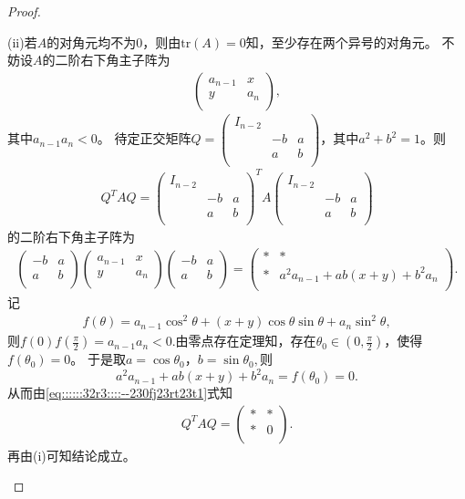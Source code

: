 \documentclass[../../main.tex]{subfiles}%
\begin{document}
\begin{proof}
\begin{enumerate}[(1)]
(ii)若$A$的对角元均不为$0$，则由$\text{tr}(A)=0$知，至少存在两个异号的对角元。
不妨设$A$的二阶右下角主子阵为
\begin{align*}
\begin{pmatrix}
a_{n-1}& x\\
y& a_n\\
\end{pmatrix},
\end{align*}
其中$a_{n-1}a_n<0$。
待定正交矩阵$Q=\begin{pmatrix}
I_{n-2}& & \\
& -b& a\\
& a& b\\
\end{pmatrix}$，其中$a^2+b^2=1$。则
\begin{align*}
Q^TAQ=\begin{pmatrix}
I_{n-2}& & \\
& -b& a\\
& a& b\\
\end{pmatrix}^T A \begin{pmatrix}
I_{n-2}& & \\
& -b& a\\
& a& b\\
\end{pmatrix}
\end{align*}
的二阶右下角主子阵为
\begin{align}
\begin{pmatrix}
-b& a\\
a& b\\
\end{pmatrix} \begin{pmatrix}
a_{n-1}& x\\
y& a_n\\
\end{pmatrix} \begin{pmatrix}
-b& a\\
a& b\\
\end{pmatrix} =\begin{pmatrix}
*& *\\
*& a^2a_{n-1}+ab(x+y)+b^2a_n\\
\end{pmatrix}.\label{eq::::::32r3::::--230fj23rt23t1}
\end{align}
记
\begin{align*}
f(\theta)=a_{n-1}\cos^2\theta+(x+y)\cos\theta\sin\theta+a_n\sin^2\theta,
\end{align*}
则$f(0)f\left( \frac{\pi}{2} \right) =a_{n-1}a_n<0$.由零点存在定理知，存在$\theta_0\in\left(0,\frac{\pi}{2}\right)$，使得$f(\theta_0)=0$。
于是取$a=\cos\theta_0$，$b=\sin\theta_0,$则
$$a^2a_{n-1}+ab(x+y)+b^2a_n=f(\theta_0)=0.$$
从而由\eqref{eq::::::32r3::::--230fj23rt23t1}式知
\begin{align*}
Q^TAQ=\begin{pmatrix}
*& *\\
*& 0\\
\end{pmatrix}.
\end{align*}
再由(i)可知结论成立。


\end{enumerate}
\end{proof}
\end{document}
